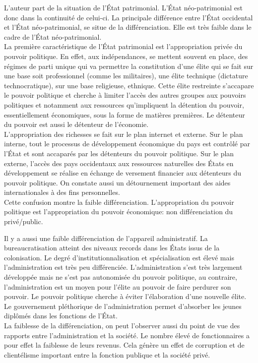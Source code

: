 \documentclass[10pt, a4paper, openany]{book}
\begin{document}
L'auteur part de la situation de l'État patrimonial. L'État néo-patrimonial est donc dans la continuité de celui-ci. La principale différence entre l'État occidental et l'État néo-patrimonial, se situe de la différenciation. Elle est très faible dans le cadre de l'État néo-patrimonial. \\
La première caractéristique de l'État patrimonial est l'appropriation privée du pouvoir politique. En effet, aux indépendances, se mettent souvent en place, des régimes de parti unique qui va permettre la constitution d'une élite qui se fait sur une base soit professionnel (comme les militaires), une élite technique (dictature technocratique), sur une base religieuse, ethnique. Cette élite restreinte s'accapare le pouvoir politique et cherche à limiter l'accès des autres groupes aux pouvoirs politiques et notamment aux ressources qu'impliquent la détention du pouvoir, essentiellement économiques, sous la forme de matières premières. Le détenteur du pouvoir est aussi le détenteur de l'économie. \\
L'appropriation des richesses se fait sur le plan internet et externe. Sur le plan interne, tout le processus de développement économique du pays est contrôlé par l'État et sont accaparés par les détenteurs du pouvoir politique. Sur le plan externe, l'accès des pays occidentaux aux ressources naturelles des États en développement se réalise en échange de versement financier aux détenteurs du pouvoir politique. On constate aussi un détournement important des aides internationales à des fins personnelles. \\
Cette confusion montre la faible différenciation. L'appropriation du pouvoir politique est l'appropriation du pouvoir économique: non différenciation du privé/public.


Il y a aussi une faible différenciation de l'appareil administratif. La bureaucratisation atteint des niveaux records dans les États issus de la colonisation. Le degré d'institutionnalisation et spécialisation est élevé mais l'administration est très peu différenciée. L'administration s'est très largement développée mais ne s'est pas autonomisée du pouvoir politique, au contraire, l'administration est un moyen pour l'élite au pouvoir de faire perdurer son pouvoir. Le pouvoir politique cherche à éviter l'élaboration d'une nouvelle élite. Le gouvernement pléthorique de l'administration permet d'absorber les jeunes diplômés dans les fonctions de l'État. \\
La faiblesse de la différenciation, on peut l'observer aussi du point de vue des rapports entre l'administration et la société. Le nombre élevé de fonctionnaires a pour effet la faiblesse de leurs revenus. Cela génère un effet de corruption et de clientélisme important entre la fonction publique et la société privé. 
\end{document}
